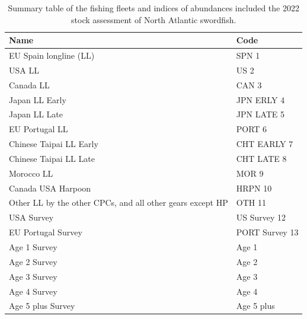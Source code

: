 \documentclass[
]{article}
\begin{document}
\begin{table}

\caption{\label{tab:fleet-info}Summary table of the fishing fleets and indices of abundances included the 2022 stock assessment of North Atlantic swordfish.}
\centering
\begin{tabu} to 
\toprule
Name & Code\\
\midrule
EU Spain longline (LL) & SPN 1\\
USA LL & US 2\\
Canada LL & CAN 3\\
Japan LL   Early & JPN ERLY 4\\
Japan LL   Late & JPN LATE 5\\
\addlinespace
EU Portugal LL & PORT 6\\
Chinese Taipai LL   Early & CHT EARLY 7\\
Chinese Taipai LL   Late & CHT LATE 8\\
Morocco LL & MOR 9\\
Canada USA Harpoon & HRPN 10\\
\addlinespace
Other   LL by the other CPCs, and all other gears except HP & OTH 11\\
USA Survey & US Survey 12\\
EU Portugal Survey & PORT Survey 13\\
Age 1 Survey & Age 1\\
Age 2 Survey & Age 2\\
\addlinespace
Age 3 Survey & Age 3\\
Age 4 Survey & Age 4\\
Age 5 plus Survey & Age 5 plus\\
\bottomrule
\end{tabu}
\end{table}
\end{document}
